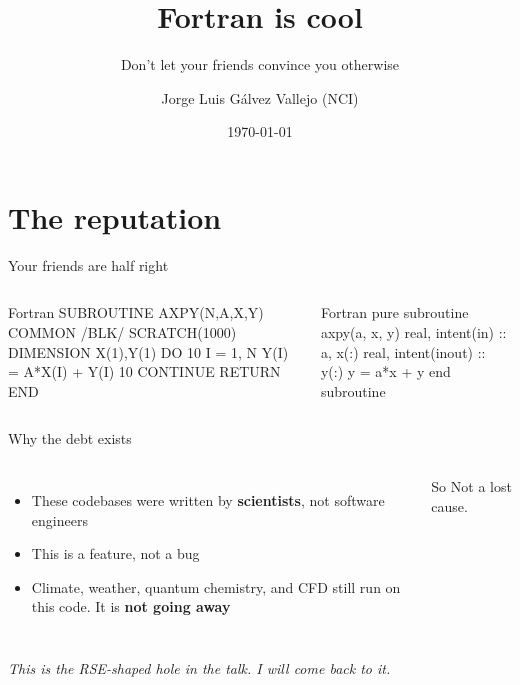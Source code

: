 \documentclass[aspectratio=169]{beamer}
\title[Fortran is cool]{Fortran is cool}
\subtitle{Don't let your friends convince you otherwise}
\author[Jorge Luis G\'alvez Vallejo \textperiodcentered\ NCI]{Jorge Luis G\'alvez Vallejo \textnormal{(NCI)}}
\institute{NCI}
\date{\today}
\begin{document}
\maketitle

\section{The reputation}

\begin{frame}[fragile]{Your friends are half right}
  \begin{columns}[T,onlytextwidth]
      \begin{cookiecode}[title=Fortran 77]{Fortran}
      SUBROUTINE AXPY(N,A,X,Y)
      COMMON /BLK/ SCRATCH(1000)
      DIMENSION X(1),Y(1)
      DO 10 I = 1, N
         Y(I) = A*X(I) + Y(I)
 10   CONTINUE
      RETURN
      END
      \end{cookiecode}
      \begin{cookiecode}[title=Modern Fortran]{Fortran}
pure subroutine axpy(a, x, y)
  real, intent(in)    :: a, x(:)
  real, intent(inout) :: y(:)
  y = a*x + y
end subroutine
      \end{cookiecode}
  \end{columns}
\end{frame}


\begin{frame}{Why the debt exists}
  \begin{columns}[T,onlytextwidth]
      \begin{itemize}
        \item These codebases were written by \textbf{scientists}, not software engineers
        \item This is a feature, not a bug
        \item Climate, weather, quantum chemistry, and CFD still run on this code. It is \textbf{not going away}
      \end{itemize}
      \begin{block}{So}
        Not a lost cause. 
      \end{block}
  \end{columns}
  \vfill
  {\footnotesize\itshape This is the RSE-shaped hole in the talk. I will come back to it.}
\end{frame}

\end{document}
